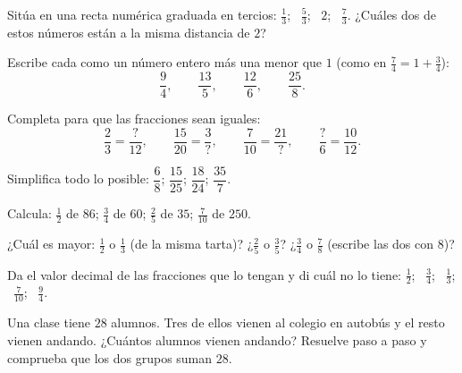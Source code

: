 \begin{exercise}[$\star$]\label{exo:g6:fractions:3}
Sitúa en una recta numérica graduada en tercios: $\frac13$; \ $\frac53$;
\ $2$; \ $\frac73$. ¿Cuáles dos de estos números están a la misma distancia de
$2$?
\end{exercise}

\begin{exercise}[$\star$]\label{exo:g6:fractions:4}
Escribe cada  como un número entero más una  menor que $1$
(como en $\frac74 = 1 + \frac34$):
\[
\frac{9}{4}, \qquad \frac{13}{5}, \qquad \frac{12}{6}, \qquad
\frac{25}{8} .
\]
\end{exercise}

\begin{exercise}[$\star$]\label{exo:g6:fractions:5}
Completa para que las fracciones sean iguales:
\[
\frac{2}{3} = \frac{?}{12}, \qquad
\frac{15}{20} = \frac{3}{?}, \qquad
\frac{7}{10} = \frac{21}{?}, \qquad
\frac{?}{6} = \frac{10}{12}.
\]
\end{exercise}

\begin{exercise}[$\star$]\label{exo:g6:fractions:6}
Simplifica todo lo posible: $\dfrac{6}{8}$; \quad $\dfrac{15}{25}$;
\quad $\dfrac{18}{24}$; \quad $\dfrac{35}{7}$.
\end{exercise}

\begin{exercise}[$\star$]\label{exo:g6:fractions:7}
Calcula: $\frac12$ de $86$; \quad $\frac34$ de $60$; \quad $\frac25$ de
$35$; \quad $\frac{7}{10}$ de $250$.
\end{exercise}

\begin{exercise}[$\star$]\label{exo:g6:fractions:8}
¿Cuál es mayor: $\frac12$ o $\frac13$ (de la misma tarta)? ¿$\frac25$
o $\frac35$? ¿$\frac34$ o $\frac78$ (escribe las dos con 
$8$)?
\end{exercise}

\begin{exercise}[$\star\star$]\label{exo:g6:fractions:9}
Da el valor decimal de las fracciones que lo tengan y di cuál
 no lo tiene: $\frac12$; \ $\frac34$; \ $\frac13$; \ $\frac{7}{10}$;
\ $\frac{9}{4}$.
\end{exercise}

\begin{exercise}[$\star\star$]\label{exo:g6:fractions:10}
Una clase tiene $28$ alumnos. Tres  de ellos vienen al colegio en
autobús y el resto vienen andando. ¿Cuántos alumnos vienen andando? Resuelve paso a paso y
comprueba que los dos grupos suman $28$.
\end{exercise}

